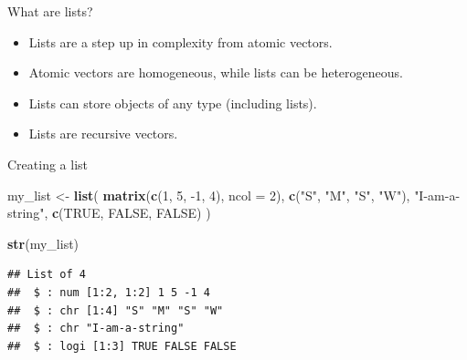 \documentclass[ignorenonframetext,]{beamer}
\newenvironment{Shaded}{\begin{snugshade}}{\end{snugshade}}
\newcommand{\DataTypeTok}[1]{\textcolor[rgb]{0.13,0.29,0.53}{#1}}
\newcommand{\DecValTok}[1]{\textcolor[rgb]{0.00,0.00,0.81}{#1}}
\newcommand{\KeywordTok}[1]{\textcolor[rgb]{0.13,0.29,0.53}{\textbf{#1}}}
\newcommand{\NormalTok}[1]{#1}
\newcommand{\OtherTok}[1]{\textcolor[rgb]{0.56,0.35,0.01}{#1}}
\newcommand{\StringTok}[1]{\textcolor[rgb]{0.31,0.60,0.02}{#1}}
\begin{document}
\begin{frame}{What are lists?}
\protect\hypertarget{what-are-lists}{}

\begin{itemize}
\item
  Lists are a step up in complexity from atomic vectors.
\item
  Atomic vectors are homogeneous, while lists can be heterogeneous.
\item
  Lists can store objects of any type (including lists).
\item
  Lists are recursive vectors.
\end{itemize}

\end{frame}

\begin{frame}[fragile]{Creating a list}
\protect\hypertarget{creating-a-list}{}

\begin{Shaded}
\begin{Highlighting}[]
\NormalTok{my_list <-}\StringTok{ }\KeywordTok{list}\NormalTok{(}
  \KeywordTok{matrix}\NormalTok{(}\KeywordTok{c}\NormalTok{(}\DecValTok{1}\NormalTok{, }\DecValTok{5}\NormalTok{, }\DecValTok{-1}\NormalTok{, }\DecValTok{4}\NormalTok{), }\DataTypeTok{ncol =} \DecValTok{2}\NormalTok{),}
  \KeywordTok{c}\NormalTok{(}\StringTok{"S"}\NormalTok{, }\StringTok{"M"}\NormalTok{, }\StringTok{"S"}\NormalTok{, }\StringTok{"W"}\NormalTok{),}
  \StringTok{"I-am-a-string"}\NormalTok{,}
  \KeywordTok{c}\NormalTok{(}\OtherTok{TRUE}\NormalTok{, }\OtherTok{FALSE}\NormalTok{, }\OtherTok{FALSE}\NormalTok{)}
\NormalTok{)}
\end{Highlighting}
\end{Shaded}

\begin{Shaded}
\begin{Highlighting}[]
\KeywordTok{str}\NormalTok{(my_list)}
\end{Highlighting}
\end{Shaded}

\begin{verbatim}
## List of 4
##  $ : num [1:2, 1:2] 1 5 -1 4
##  $ : chr [1:4] "S" "M" "S" "W"
##  $ : chr "I-am-a-string"
##  $ : logi [1:3] TRUE FALSE FALSE
\end{verbatim}

\end{frame}
\end{document}
